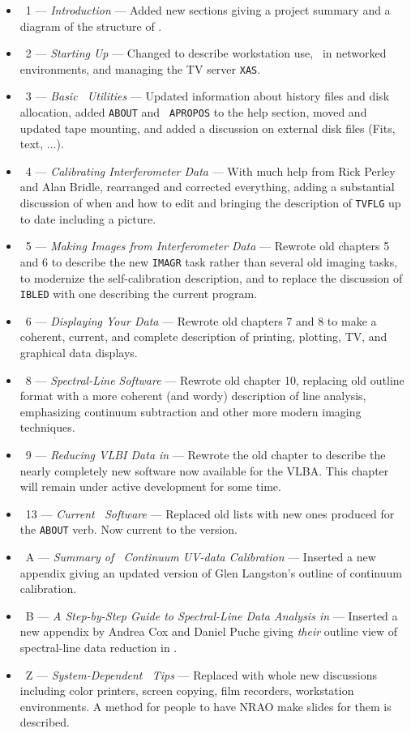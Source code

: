 \begin{itemize}
\item\ 1 --- {\it Introduction} --- Added new sections giving a
   project summary and a diagram of the structure of \hbox{\AIPS}.
\item\ 2 --- {\it Starting Up \AIPS} ---  Changed to describe
   workstation use, \AIPS\ in networked environments, and managing the
   TV server \hbox{{\tt XAS}}.
\item\ 3 --- {\it Basic \AIPS\ Utilities} --- Updated information about
   history files and disk allocation, added {\tt ABOUT} and {\tt
   APROPOS} to the help section, moved and updated tape mounting, and
   added a discussion on external disk files (Fits, text, $\ldots$).
\item\ 4 --- {\it Calibrating Interferometer Data} --- With much help
   from Rick Perley and Alan Bridle, rearranged and corrected
   everything, adding a substantial discussion of when and how to edit
   and bringing the description of {\tt TVFLG} up to date including a
   picture.
\item\ 5 --- {\it Making Images from Interferometer Data} --- Rewrote
   old chapters 5 and 6 to describe the new {\tt IMAGR} task rather
   than several old imaging tasks, to modernize the self-calibration
   description, and to replace the discussion of {\tt    IBLED} with
   one describing the current program.
\item\ 6 --- {\it Displaying Your Data} --- Rewrote old chapters 7
   and 8 to make a coherent, current, and complete description of
   printing, plotting, TV, and graphical data displays.
\item\ 8 --- {\it Spectral-Line Software} --- Rewrote old chapter 10,
   replacing old outline format with a more coherent (and wordy)
   description of line analysis, emphasizing continuum subtraction and
   other more modern imaging techniques.
\item\ 9 --- {\it Reducing VLBI Data in \AIPS} --- Rewrote the old
   chapter to describe the nearly completely new software now
   available for the \hbox{VLBA}.  This chapter will remain under
   active development for some time.
\item\ 13 --- {\it Current \AIPS\ Software} --- Replaced old lists with
   new ones produced for the {\tt ABOUT} verb.  Now current to the
   \RELEASENAME version.
\item\ A --- {\it Summary of \AIPS\ Continuum UV-data Calibration} ---
   Inserted a new appendix giving an updated version of Glen
   Langston's outline of continuum calibration.
\item\ B --- {\it A Step-by-Step Guide to Spectral-Line Data Analysis
   in \AIPS} --- Inserted a new appendix by Andrea Cox and Daniel
   Puche giving {\it their} outline view of spectral-line data
   reduction in \hbox{\AIPS}.
\item\ Z --- {\it System-Dependent \AIPS\ Tips} --- Replaced with whole
   new discussions including color printers, screen copying, film
   recorders, workstation environments.  A method for people to have
   NRAO make slides for them is described.
\end{itemize}
\vfill
\eject

